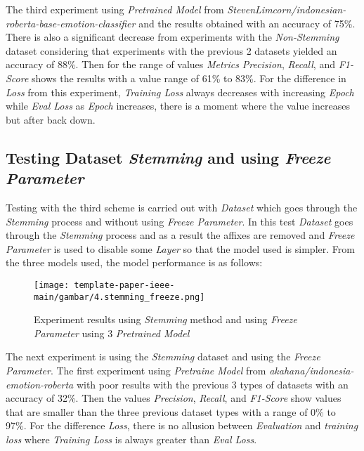 The third experiment using \textit{Pretrained Model} from \textit{StevenLimcorn/indonesian-roberta-base-emotion-classifier} and the results obtained with an accuracy of 75\%. There is also a significant decrease from experiments with the \textit{Non-Stemming} dataset considering that experiments with the previous 2 datasets yielded an accuracy of 88\%. Then for the range of values \textit{Metrics} \textit{Precision}, \textit{Recall}, and \textit{F1-Score} shows the results with a value range of 61\% to 83\%. For the difference in \textit{Loss} from this experiment, \textit{Training Loss} always decreases with increasing \textit{Epoch} while \textit{Eval Loss} as \textit{Epoch} increases, there is a moment where the value increases but after back down.

\subsection{Testing Dataset \textit{Stemming} and using \textit{Freeze Parameter}}

Testing with the third scheme is carried out with \textit{Dataset} which goes through the \textit{Stemming} process and without using \textit{Freeze Parameter}. In this test \textit{Dataset} goes through the \textit{Stemming} process and as a result the affixes are removed and \textit{Freeze Parameter} is used to disable some \textit{Layer} so that the model used is simpler. From the three models used, the model performance is as follows:

\begin{figure}[h]
    \begin{center}
        \texttt{[image: template-paper-ieee-main/gambar/4.stemming\_freeze.png]}
        \caption{Experiment results using \textit{Stemming} method and using \textit{Freeze Parameter} using 3 \textit{Pretrained Model}}
        \label{fig: bertToken}
    \end{center}
\end{figure}

The next experiment is using the \textit{Stemming} dataset and using the \textit{Freeze Parameter}. The first experiment using \textit{Pretraine Model} from \textit{akahana/indonesia-emotion-roberta} with poor results with the previous 3 types of datasets with an accuracy of 32\%. Then the values \textit{Precision}, \textit{Recall}, and \textit{F1-Score} show values that are smaller than the three previous dataset types with a range of 0\% to 97\%. For the difference \textit{Loss}, there is no allusion between \textit{Evaluation} and \textit{training loss} where \textit{Training Loss} is always greater than \textit{Eval Loss}.

